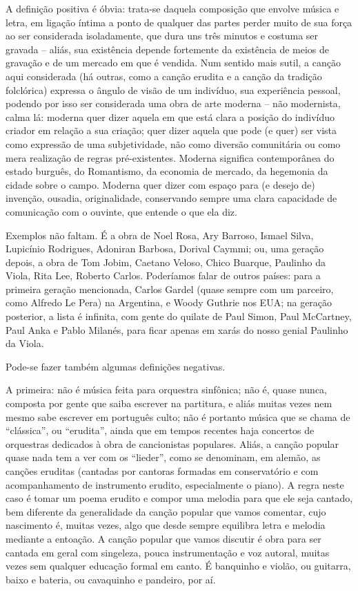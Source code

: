 A definição positiva é óbvia: trata-se daquela composição que envolve
música e letra, em ligação íntima a ponto de qualquer das partes perder
muito de sua força ao ser considerada isoladamente, que dura uns três
minutos e costuma ser gravada -- aliás, sua existência depende
fortemente da existência de meios de gravação e de um mercado em que é
vendida. Num sentido mais sutil, a canção aqui considerada (há outras,
como a canção erudita e a canção da tradição folclórica) expressa o
ângulo de visão de um indivíduo, sua experiência pessoal, podendo por
isso ser considerada uma obra de arte moderna -- não modernista, calma
lá: moderna quer dizer aquela em que está clara a posição do indivíduo
criador em relação a sua criação; quer dizer aquela que pode (e quer)
ser vista como expressão de uma subjetividade, não como diversão
comunitária ou como mera realização de regras pré-existentes. Moderna
significa contemporânea do estado burguês, do Romantismo, da economia de
mercado, da hegemonia da cidade sobre o campo. Moderna quer dizer com
espaço para (e desejo de) invenção, ousadia, originalidade, conservando
sempre uma clara capacidade de comunicação com o ouvinte, que entende o
que ela diz.

Exemplos não faltam. É a obra de Noel Rosa, Ary Barroso, Ismael Silva,
Lupicínio Rodrigues, Adoniran Barbosa, Dorival Caymmi; ou, uma geração
depois, a obra de Tom Jobim, Caetano Veloso, Chico Buarque, Paulinho da
Viola, Rita Lee, Roberto Carlos. Poderíamos falar de outros países: para
a primeira geração mencionada, Carlos Gardel (quase sempre com um
parceiro, como Alfredo Le Pera) na Argentina, e Woody Guthrie nos EUA;
na geração posterior, a lista é infinita, com gente do quilate de Paul
Simon, Paul McCartney, Paul Anka e Pablo Milanés, para ficar apenas em
xarás do nosso genial Paulinho da Viola.

Pode-se fazer também algumas definições negativas.

A primeira: não é música feita para orquestra sinfônica; não é, quase
nunca, composta por gente que saiba escrever na partitura, e aliás
muitas vezes nem mesmo sabe escrever em português culto; não é portanto
música que se chama de ``clássica'', ou ``erudita'', ainda que em tempos
recentes haja concertos de orquestras dedicados à obra de cancionistas
populares. Aliás, a canção popular quase nada tem a ver com os
``lieder'', como se denominam, em alemão, as canções eruditas (cantadas
por cantoras formadas em conservatório e com acompanhamento de
instrumento erudito, especialmente o piano). A regra neste caso é tomar
um poema erudito e compor uma melodia para que ele seja cantado, bem
diferente da generalidade da canção popular que vamos comentar, cujo
nascimento é, muitas vezes, algo que desde sempre equilibra letra e
melodia mediante a entoação. A canção popular que vamos discutir é obra
para ser cantada em geral com singeleza, pouca instrumentação e voz
autoral, muitas vezes sem qualquer educação formal em canto. É banquinho
e violão, ou guitarra, baixo e bateria, ou cavaquinho e pandeiro, por
aí.

